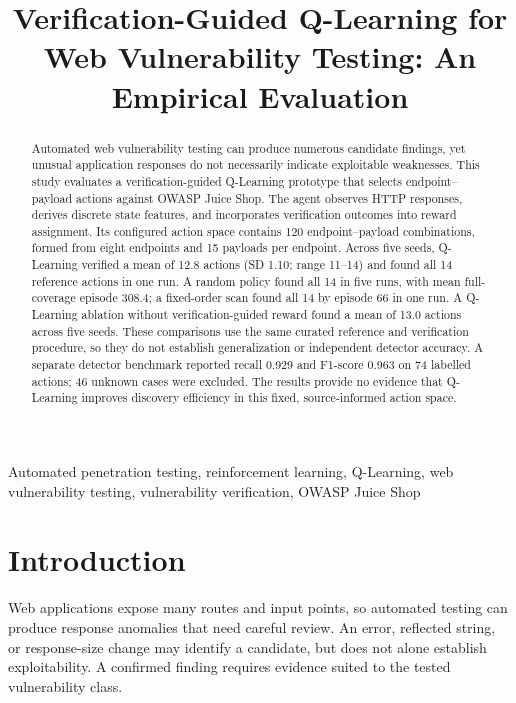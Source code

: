 \documentclass[conference, a4paper]{IEEEtran}
\title{
Verification-Guided Q-Learning for Web Vulnerability Testing:
An Empirical Evaluation
}
\author{
\IEEEauthorblockN{Kevin Imanuel Setiawan}
\IEEEauthorblockA{
Program Studi Teknologi Informasi, Fakultas Informatika\\
Telkom University Surabaya\\
Surabaya, Indonesia
}
}
\begin{document}
\maketitle

\begin{abstract}
Automated web vulnerability testing can produce numerous
candidate findings, yet unusual application responses do not
necessarily indicate exploitable weaknesses. This study
evaluates a verification-guided Q-Learning prototype that
selects endpoint--payload actions against OWASP Juice Shop.
The agent observes HTTP responses, derives discrete state
features, and incorporates verification outcomes into reward
assignment. Its configured action space contains 120
endpoint--payload combinations, formed from eight endpoints
and 15 payloads per endpoint. Across five seeds, Q-Learning
verified a mean of 12.8 actions (SD 1.10; range 11--14) and
found all 14 reference actions in one run. A random policy found
all 14 in five runs, with mean full-coverage episode 308.4; a
fixed-order scan found all 14 by episode 66 in one run. A
Q-Learning ablation without verification-guided reward found a
mean of 13.0 actions across five seeds. These comparisons use
the same curated reference and verification procedure, so they
do not establish generalization or independent detector accuracy.
A separate detector benchmark reported recall 0.929 and F1-score
0.963 on 74 labelled actions; 46 unknown cases were excluded.
The results provide no evidence that Q-Learning improves
discovery efficiency in this fixed, source-informed action space.

\end{abstract}
\begin{IEEEkeywords}
Automated penetration testing, reinforcement learning, Q-Learning,
web vulnerability testing, vulnerability verification, OWASP Juice Shop
\end{IEEEkeywords}
\section{Introduction}

Web applications expose many routes and input points, so automated
testing can produce response anomalies that need careful review.
An error, reflected string, or response-size change may identify a
candidate, but does not alone establish exploitability. A confirmed
finding requires evidence suited to the tested vulnerability class.
\end{document}
